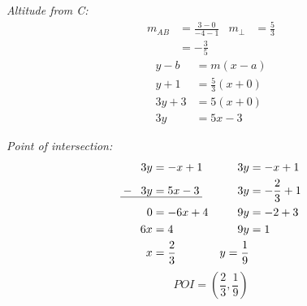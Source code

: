 \begin{enumerate}
	\textit{Altitude from C:}
	\begin{align*}
		m_{AB}&=\frac{3-0}{-4-1} & m_\perp&=\frac{5}{3} \\
		&=-\frac{3}{5}
	\end{align*}
	\begin{align*}
		y-b&=m(x-a)\\
		y+1&=\frac{5}{3}\left(x+0\right)\\
		3y+3&=5\left(x+0\right)\\
		3y&=5x-3
	\end{align*}
	
	\textit{Point of intersection:}
	\begin{align*}
		3y&=-x+1 & 3y&=-x+1\\
		\makebox[0pt][l]{\uline{\phantom{$--3y=5x-3$}}}
		-\;\;3y&=5x-3 & 3y&=-\frac{2}{3}+1\\
		0&=-6x+4 & 9y&=-2+3\\
		6x&=4 & 9y&=1\\
		x&=\frac{2}{3} & y=\frac{1}{9}\\
	\end{align*}
	\begin{equation*}
		POI = \left(\frac{2}{3},\frac{1}{9}\right)
	\end{equation*}
\end{enumerate}
